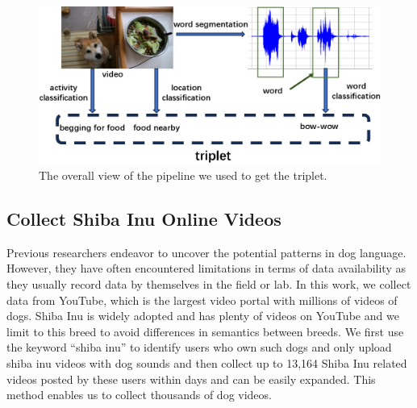 \begin{figure}[th]
	\centering
	\includegraphics[width=\columnwidth]{images/method.png}
	\caption{The overall view of the pipeline we used to get the triplet.}

\label{fig:method}
\end{figure}

\subsection{Collect Shiba Inu Online Videos}
\label{sec:collect_data}
Previous researchers endeavor to uncover the potential patterns in dog language. However, they have often encountered limitations in terms of data availability as they usually record data by themselves in the field or lab. In this work, we collect data from 
YouTube, which is the largest video portal with millions of videos of dogs. Shiba Inu is widely adopted and has plenty of videos on YouTube and we limit to this breed to avoid differences in semantics between breeds.
We first use the keyword ``shiba inu'' to identify users who own such dogs and only upload shiba inu videos with dog sounds and then collect up to 13,164 Shiba Inu related videos posted by these users within days and can be easily expanded.
This method enables us to collect thousands of dog videos.


